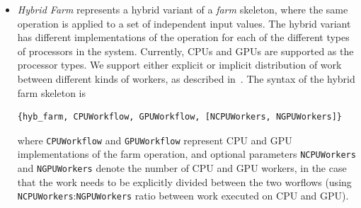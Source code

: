 \documentclass[final]{jfp1}
\begin{document}
\begin{itemize}
\item \emph{Hybrid Farm} represents a hybrid variant of a \emph{farm} skeleton, where the same operation is applied to a set of independent input values. The hybrid variant has different implementations of the operation for each of the different types of processors in the system. Currently, CPUs and GPUs are supported as the processor types. We support either explicit or implicit distribution of work between different kinds of workers, as described in~\cite{parco2015}. The syntax of the hybrid farm skeleton is

\begin{lstlisting}
{hyb_farm, CPUWorkflow, GPUWorkflow, [NCPUWorkers, NGPUWorkers]}
\end{lstlisting}

\noindent
where \lstinline{CPUWorkflow} and \lstinline{GPUWorkflow} represent CPU and GPU implementations of the farm operation, and optional parameters \lstinline{NCPUWorkers} and \lstinline{NGPUWorkers} denote the number of CPU and GPU workers, in the case that the work needs to be explicitly divided between the two worflows (using \lstinline{NCPUWorkers}:\lstinline{NGPUWorkers} ratio between work executed on CPU and GPU).




\end{itemize}
\end{document}
